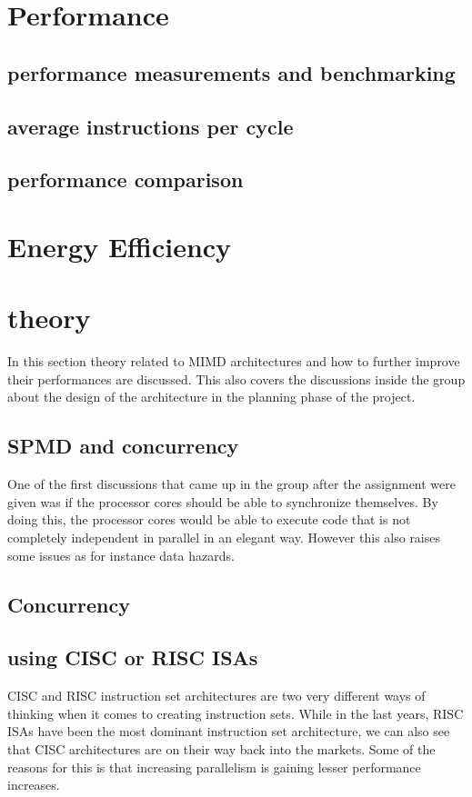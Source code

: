 \section{Performance}
\subsection{performance measurements and benchmarking}
\subsection{average instructions per cycle}
\subsection{performance comparison}


\section{Energy Efficiency}

\section{theory}
In this section theory related to MIMD architectures and how to further improve their performances are discussed.
This also covers the discussions inside the group about the design of the architecture in the planning phase of the project.
\subsection{SPMD and concurrency}
One of the first discussions that came up in the group after the assignment were given was if the processor cores should
be able to synchronize themselves. By doing this, the processor cores would be able to execute code that is not completely independent in parallel in an elegant way.
However this also raises some issues as for instance data hazards.


\subsection{Concurrency} 





\subsection{using CISC or RISC ISAs}
CISC and RISC instruction set architectures are two very different ways of thinking when it comes to creating instruction sets.
While in the last years, RISC ISAs have been the most dominant instruction set architecture, we can also see that CISC architectures
are on their way back into the markets. Some of the reasons for this is that increasing parallelism is gaining lesser performance increases.

